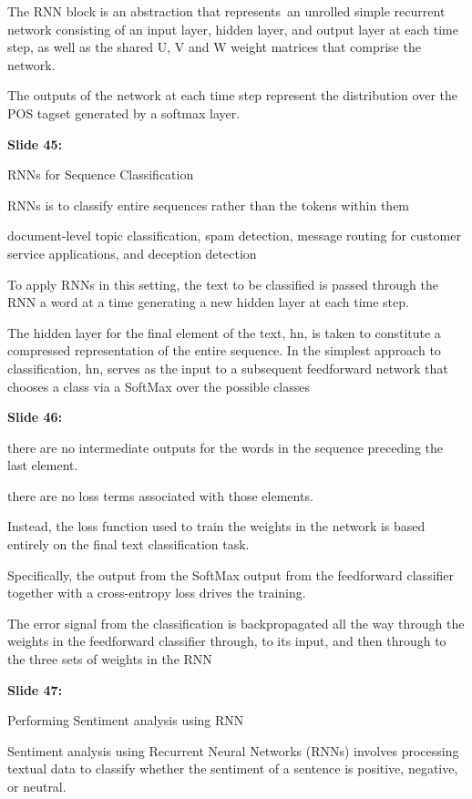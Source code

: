 \documentclass[11pt,a4paper]{article}
\begin{document}
The RNN block is an abstraction that represents an unrolled simple recurrent network consisting of an input layer, hidden layer, and output layer at each time step, as well as the shared U, V and W weight matrices that comprise the network.

The outputs of the network at each time step represent the distribution over the POS tagset generated by a softmax layer.

\textbf{Slide 45:}

RNNs for Sequence Classification

RNNs is to classify entire sequences rather than the tokens within them

document-level topic classification, spam detection, message routing for customer service applications, and deception detection

To apply RNNs in this setting, the text to be classified is passed through the RNN a word at a time generating a new hidden layer at each time step.

The hidden layer for the final element of the text, hn, is taken to constitute a compressed representation of the entire sequence. In the simplest approach to classification, hn, serves as theinput to a subsequent feedforward network that chooses a class via a SoftMax over the possible classes

\textbf{Slide 46:}

there are no intermediate outputs for the words in the sequence preceding the last element.

there are no loss terms associated with those elements.

Instead, the loss function used to train the weights in the network is based entirely on the final text classification task.

Specifically, the output from the SoftMax output from the feedforward classifier together with a cross-entropy loss drives the training.

The error signal from the classification is backpropagated all the way through the weights in the feedforward classifier through, to its input, and then through to the three sets of weights in the RNN

\textbf{Slide 47:}

Performing Sentiment analysis using RNN

Sentiment analysis using Recurrent Neural Networks (RNNs) involves processing textual data to classify whether the sentiment of a sentence is positive, negative, or neutral.
\end{document}
